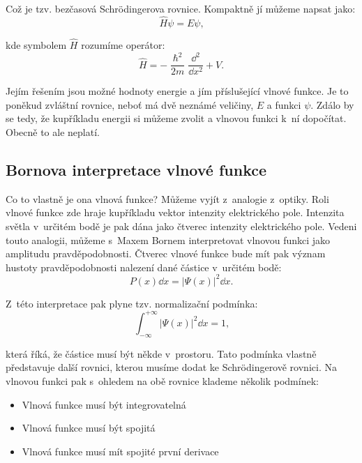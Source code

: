 \noindent Což je tzv. bezčasová Schr\"odingerova rovnice. Kompaktně jí můžeme napsat jako:
\begin{equation}
\hat{H}\psi = E\psi\mbox{,}
\label{rov:Pohyboverovnice7}
\end{equation}

\noindent kde symbolem $\hat{H}$ rozumíme operátor:
\begin{equation}
\hat{H} = -\frac{\hslash^2}{2m}\frac{\dd^2}{\dd x^2} + V\mbox{.}
\label{rov:Pohyboverovnice8}
\end{equation}

\noindent Jejím řešením jsou možné hodnoty energie a jím příslušející vlnové funkce. Je to poněkud zvláštní rovnice, neboť má dvě neznámé veličiny, $E$ a funkci $\psi$. Zdálo by se tedy, že kupříkladu energii si můžeme zvolit a vlnovou funkci k~ní dopočítat. Obecně to ale neplatí. 

\subsection{Bornova interpretace vlnové funkce}
\label{kap:Bornova interpretace vlnové funkce}

Co to vlastně je ona vlnová funkce?  Můžeme vyjít z~analogie z~optiky. Roli vlnové funkce zde hraje kupříkladu vektor intenzity elektrického pole. Intenzita světla v~určitém bodě je pak dána jako čtverec intenzity elektrického pole.
Vedeni touto analogii, můžeme s~Maxem Bornem interpretovat vlnovou funkci jako amplitudu pravděpodobnosti. Čtverec vlnové funkce bude mít pak význam hustoty pravděpodobnosti nalezení dané částice v~určitém bodě:
\begin{equation}
P(x)\dd x = |\Psi (x)|^2\dd x \mbox{.}
\label{rov:Born1}
\end{equation}

\noindent Z~této interpretace pak plyne tzv. normalizační podmínka:
\begin{equation}
\int _{-\infty}^{+\infty} |\Psi(x)|^2 \dd x = 1\mbox{,}
\label{rov:Born2}
\end{equation}

\noindent která říká, že částice musí být někde v~prostoru. Tato podmínka vlastně představuje další rovnici, kterou musíme dodat ke Schr\"odingerově rovnici. Na vlnovou funkci pak s~ohledem na obě rovnice klademe několik podmínek:
\begin{itemize}
\item Vlnová funkce musí být integrovatelná
\item Vlnová funkce musí být spojitá
\item Vlnová funkce musí mít spojité první derivace
\end{itemize}

